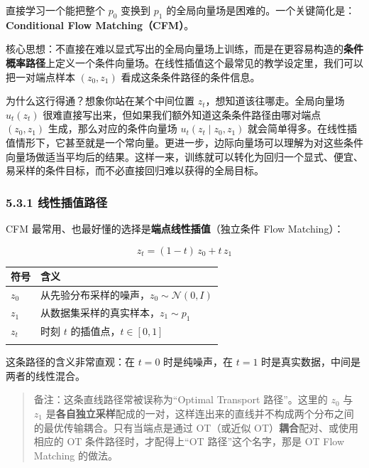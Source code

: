 \documentclass[
  chinese,
]{ctexart}
\begin{document}
直接学习一个能把整个 \(p_0\) 变换到 \(p_1\)
的全局向量场是困难的。一个关键简化是：\textbf{Conditional Flow
Matching（CFM）}。

核心思想：不直接在难以显式写出的全局向量场上训练，而是在更容易构造的\textbf{条件概率路径}上定义一个条件向量场。在线性插值这个最常见的教学设定里，我们可以把一对端点样本
\((z_0, z_1)\) 看成这条条件路径的条件信息。

为什么这行得通？想象你站在某个中间位置
\(z_t\)，想知道该往哪走。全局向量场 \(u_t(z_t)\)
很难直接写出来，但如果我们额外知道这条条件路径由哪对端点 \((z_0, z_1)\)
生成，那么对应的条件向量场 \(u_t(z_t \mid z_0, z_1)\)
就会简单得多。在线性插值情形下，它甚至就是一个常向量。更进一步，边际向量场可以理解为对这些条件向量场做适当平均后的结果。这样一来，训练就可以转化为回归一个显式、便宜、易采样的条件目标，而不必直接回归难以获得的全局目标。

\subsubsection{5.3.1
线性插值路径}\label{ux7ebfux6027ux63d2ux503cux8defux5f84}

CFM 最常用、也最好懂的选择是\textbf{端点线性插值}（独立条件 Flow
Matching）：

\[
z_t = (1 - t)\, z_0 + t\, z_1
\]

\begin{center}
\begin{tabular}{@{}>{\raggedright\arraybackslash}p{} >{\raggedright\arraybackslash}p{}@{}}
\toprule\noalign{}
符号 & 含义 \\
\midrule\noalign{}
\(z_0\) & 从先验分布采样的噪声，\(z_0 \sim \mathcal{N}(0, I)\) \\
\(z_1\) & 从数据集采样的真实样本，\(z_1 \sim p_1\) \\
\(z_t\) & 时刻 \(t\) 的插值点，\(t \in [0, 1]\) \\
\bottomrule\noalign{}
\end{tabular}
\end{center}

这条路径的含义非常直观：在 \(t=0\) 时是纯噪声，在 \(t=1\)
时是真实数据，中间是两者的线性混合。

\begin{quote}
备注：这条直线路径常被误称为``Optimal Transport 路径''。这里的 \(z_0\)
与 \(z_1\)
是\textbf{各自独立采样}配成的一对，这样连出来的直线并不构成两个分布之间的最优传输耦合。只有当端点是通过
OT（或近似 OT）\textbf{耦合}配对、或使用相应的 OT
条件路径时，才配得上``OT 路径''这个名字，那是 OT Flow Matching 的做法。
\end{quote}
\end{document}
